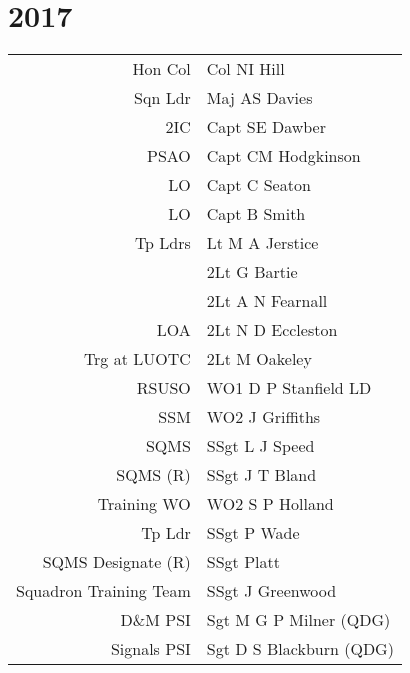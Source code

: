 \chapter*{2017}

\begin{center}
  \small
  \begin{tabular}{rl}
    Hon Col & Col NI Hill \\
    Sqn Ldr & Maj AS Davies \\
    2IC & Capt SE Dawber \\
    PSAO & Capt CM Hodgkinson \\
    LO & Capt C Seaton \\
    LO & Capt B Smith \\
    Tp Ldrs & Lt M A Jerstice \\
     & 2Lt G Bartie \\
     & 2Lt A N Fearnall \\
    LOA & 2Lt N D Eccleston \\
    Trg at LUOTC & 2Lt M Oakeley \\
    RSUSO & WO1 D P Stanfield LD \\
    SSM & WO2 J Griffiths \\
    SQMS & SSgt L J Speed \\
    SQMS (R) & SSgt J T Bland \\
    Training WO & WO2 S P Holland \\
    Tp Ldr & SSgt P Wade \\
    SQMS Designate (R) & SSgt Platt \\
    Squadron Training Team & SSgt J Greenwood \\
    D\&M PSI & Sgt M G P Milner (QDG) \\
    Signals PSI & Sgt D S Blackburn (QDG) \\
  \end{tabular}
\end{center}

